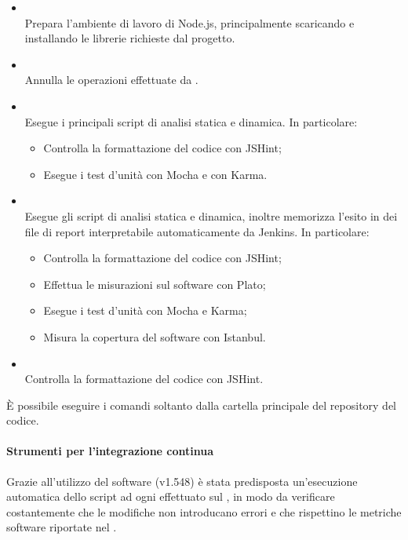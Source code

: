 \begin{itemize}
	\item \textbf{} \\
	Prepara l'ambiente di lavoro di Node.js, principalmente scaricando e installando le librerie richieste dal progetto.
		
	\item \textbf{} \\
	Annulla le operazioni effettuate da .

	\item \textbf{} \\
	Esegue i principali script di analisi statica e dinamica. In particolare:
	\begin{itemize}
	\item Controlla la formattazione del codice con JSHint;
	\item Esegue i test d'unità con Mocha e con Karma.
	\end{itemize}

	\item \textbf{} \\
	Esegue gli script di analisi statica e dinamica, inoltre memorizza l'esito in dei file di report interpretabile automaticamente da Jenkins. In particolare:
	\begin{itemize}
	\item Controlla la formattazione del codice con JSHint;
	\item Effettua le misurazioni sul software con Plato;
	\item Esegue i test d'unità con Mocha e Karma;
	\item Misura la copertura del software con Istanbul.
	\end{itemize}

	\item \textbf{} \\
	Controlla la formattazione del codice con JSHint.
\end{itemize}

È possibile eseguire i comandi soltanto dalla cartella principale del repository del codice.

	\paragraph{Strumenti per l'integrazione continua}
	\label{jenkins}
	
	Grazie all'utilizzo del software \textbf{} (v1.548) è stata predisposta un'esecuzione automatica dello script  ad ogni  effettuato sul , in modo da verificare costantemente che le modifiche non introducano errori e che rispettino le metriche software riportate nel \PianoDiQualifica{}.
	
